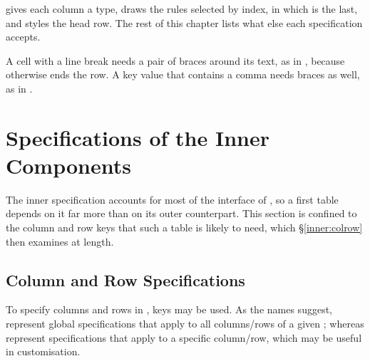  gives each column a type,  draws the rules selected by index, in which  is the last, and  styles the head row. The rest of this chapter lists what else each specification accepts.

A cell with a line break needs a pair of braces around its text, as in , because \tsverb{\\} otherwise ends the row. A key value that contains a comma needs braces as well, as in .

\section{Specifications of the Inner Components}\label{impatient:inner}
The inner specification accounts for most of the interface of , so a first table depends on it far more than on its outer counterpart. This section is confined to the column and row keys that such a table is likely to need, which \S\ref{inner:colrow} then examines at length.

\subsection{Column and Row Specifications}
To specify columns and rows in ,  keys may be used. As the names suggest,  represent global specifications that apply to all columns/rows of a given ; whereas  represent specifications that apply to a specific column/row, which may be useful in customisation.

